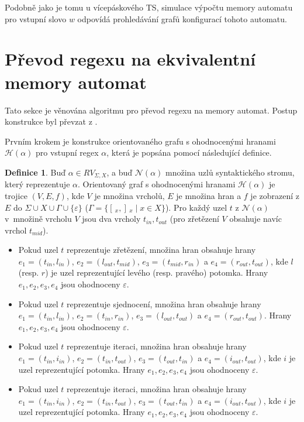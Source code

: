 \documentclass[thesis=B,czech]{FITthesis}[2019/12/23]
\theoremstyle{definition}
\newtheorem{definition}{Definice}[chapter]
\begin{document}
Podobně jako je tomu u vícepáskového TS, simulace výpočtu memory automatu pro vstupní slovo $w$ odpovídá prohledávání grafů konfigurací tohoto automatu. 

\section{Převod regexu na ekvivalentní memory automat}\label{section:simplemem}
Tato sekce je věnována algoritmu pro převod regexu na memory automat. Postup konstrukce byl převzat z \cite[sekce 2.3]{schmidref}.

Prvním krokem je konstrukce orientovaného grafu s ohodnocenými hranami $\mathcal{H}(\alpha)$ pro vstupní regex $\alpha$, která je popsána pomocí následující definice.     

\begin{definition}Buď $\alpha \in RV_{\Sigma, X}$, a buď $\mathcal{N}(\alpha)$ množina uzlů syntaktického stromu, který reprezentuje $\alpha$.
Orientovaný graf s ohodnocenými hranami $\mathcal{H}(\alpha)$ je trojice $(V, E, f)$, kde $V$ je množina vrcholů, $E$ je množina hran a $f$ je zobrazení z $E$ do $\Sigma\cup X \cup \Gamma \cup \{\varepsilon\}$ ($\Gamma = \{ [\,_x, ]\,_x \mid x \in X \}$). Pro každý uzel $t$ z $\mathcal{N}(\alpha)$ v~množině vrcholu $V$ jsou dva vrcholy $t_{in}, t_{out}$ (pro zřetězení $V$ obsahuje navíc vrchol $t_{mid}$). 
	\begin{itemize}
		\item{Pokud uzel $t$ reprezentuje zřetězení, množina hran obsahuje hrany $e_1 = (t_{in}, l_{in})$, $e_2=(l_{out}, t_{mid})$, $e_3=(t_{mid}, r_{in})$ a $e_4=(r_{out}, t_{out})$, kde $l$ (resp. $r$) je uzel reprezentující levého (resp. pravého) potomka. Hrany $e_1, e_2, e_3, e_4$ jsou ohodnoceny $\varepsilon$.}
		\item{Pokud uzel $t$ reprezentuje sjednocení, množina hran obsahuje hrany $e_1 = (t_{in}, l_{in})$, $e_2=(t_{in}, r_{in})$, $e_3=(l_{out}, t_{out})$ a $e_4=(r_{out}, t_{out})$. Hrany $e_1, e_2, e_3, e_4$ jsou ohodnoceny $\varepsilon$.}
		\item{Pokud uzel $t$ reprezentuje iteraci, množina hran obsahuje hrany $e_1 = (t_{in}, i_{in})$, $e_2=(t_{in}, t_{out})$, $e_3=(t_{out}, t_{in})$ a $e_4=(i_{out}, t_{out})$, kde $i$ je uzel reprezentující potomka. Hrany $e_1, e_2, e_3, e_4$ jsou ohodnoceny $\varepsilon$.}
		\item{Pokud uzel $t$ reprezentuje iteraci, množina hran obsahuje hrany $e_1 = (t_{in}, i_{in})$, $e_2=(t_{in}, t_{out})$, $e_3=(t_{out}, t_{in})$ a $e_4=(i_{out}, t_{out})$, kde $i$ je uzel reprezentující potomka. Hrany $e_1, e_2, e_3, e_4$ jsou ohodnoceny $\varepsilon$.}

\end{itemize}
\end{definition}
\end{document}
